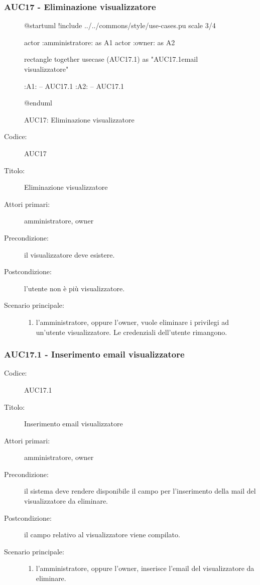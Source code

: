 \documentclass[../analisi-dei-requisiti.tex]{subfiles}
\begin{document}
\subsubsection{AUC17 - Eliminazione visualizzatore}%
\label{subsub:AUC17}

\begin{figure}[h!]
  \centering
  \begin{plantuml}
  @startuml
  !include ../../commons/style/use-cases.pu
  scale 3/4

  actor :amministratore: as A1
  actor :owner: as A2

  rectangle {
    together {
      usecase (AUC17.1) as "AUC17.1\nInserimento email visualizzatore"
    }
  }

  :A1: -- AUC17.1
  :A2: -- AUC17.1

  @enduml
  \end{plantuml}
  \caption{AUC17: Eliminazione visualizzatore}
  \label{fig:auc17}
\end{figure}

\begin{description}
  \item[Codice:] AUC17
  \item[Titolo:] Eliminazione visualizzatore
  \item[Attori primari:] amministratore, owner
  \item[Precondizione:] il visualizzatore deve esistere.
  \item[Postcondizione:] l'utente non è più visualizzatore.
  \item[Scenario principale:]
  \begin{enumerate}
    \item l'amministratore, oppure l'owner, vuole eliminare i privilegi ad un'utente visualizzatore. Le credenziali dell'utente rimangono.
  \end{enumerate}
\end{description}

\subsubsection{AUC17.1 - Inserimento email visualizzatore}%
\label{subsub:AUC17.1}
\begin{description}
  \item[Codice:] AUC17.1
  \item[Titolo:] Inserimento email visualizzatore
  \item[Attori primari:] amministratore, owner
  \item[Precondizione:] il sistema deve rendere disponibile il campo per l'inserimento della mail del visualizzatore da eliminare.
  \item[Postcondizione:] il campo relativo al visualizzatore viene compilato.
  \item[Scenario principale:]
  \begin{enumerate}
    \item l'amministratore, oppure l'owner, inserisce l'email del visualizzatore da eliminare.
  \end{enumerate}
\end{description}
\end{document}
